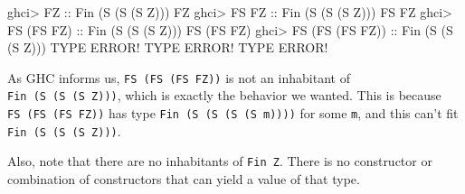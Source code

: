 \documentclass[]{article}
\newenvironment{Shaded}{}{}
\newcommand{\DataTypeTok}[1]{\textcolor[rgb]{0.56,0.13,0.00}{#1}}
\newcommand{\NormalTok}[1]{#1}
\newcommand{\OperatorTok}[1]{\textcolor[rgb]{0.40,0.40,0.40}{#1}}
\newcommand{\OtherTok}[1]{\textcolor[rgb]{0.00,0.44,0.13}{#1}}
\begin{document}
\begin{Shaded}
\begin{Highlighting}[]
\NormalTok{ghci}\OperatorTok{\textgreater{}} \DataTypeTok{FZ}\OtherTok{              ::} \DataTypeTok{Fin}\NormalTok{ (}\DataTypeTok{\textquotesingle{}S}\NormalTok{ (}\DataTypeTok{\textquotesingle{}S}\NormalTok{ (}\DataTypeTok{\textquotesingle{}S} \DataTypeTok{\textquotesingle{}Z}\NormalTok{)))}
\DataTypeTok{FZ}
\NormalTok{ghci}\OperatorTok{\textgreater{}} \DataTypeTok{FS} \DataTypeTok{FZ}\OtherTok{           ::} \DataTypeTok{Fin}\NormalTok{ (}\DataTypeTok{\textquotesingle{}S}\NormalTok{ (}\DataTypeTok{\textquotesingle{}S}\NormalTok{ (}\DataTypeTok{\textquotesingle{}S} \DataTypeTok{\textquotesingle{}Z}\NormalTok{)))}
\DataTypeTok{FS} \DataTypeTok{FZ}
\NormalTok{ghci}\OperatorTok{\textgreater{}} \DataTypeTok{FS}\NormalTok{ (}\DataTypeTok{FS} \DataTypeTok{FZ}\NormalTok{)}\OtherTok{      ::} \DataTypeTok{Fin}\NormalTok{ (}\DataTypeTok{\textquotesingle{}S}\NormalTok{ (}\DataTypeTok{\textquotesingle{}S}\NormalTok{ (}\DataTypeTok{\textquotesingle{}S} \DataTypeTok{\textquotesingle{}Z}\NormalTok{)))}
\DataTypeTok{FS}\NormalTok{ (}\DataTypeTok{FS} \DataTypeTok{FZ}\NormalTok{)}
\NormalTok{ghci}\OperatorTok{\textgreater{}} \DataTypeTok{FS}\NormalTok{ (}\DataTypeTok{FS}\NormalTok{ (}\DataTypeTok{FS} \DataTypeTok{FZ}\NormalTok{))}\OtherTok{ ::} \DataTypeTok{Fin}\NormalTok{ (}\DataTypeTok{\textquotesingle{}S}\NormalTok{ (}\DataTypeTok{\textquotesingle{}S}\NormalTok{ (}\DataTypeTok{\textquotesingle{}S} \DataTypeTok{\textquotesingle{}Z}\NormalTok{)))}
\DataTypeTok{TYPE} \DataTypeTok{ERROR}\OperatorTok{!}  \DataTypeTok{TYPE} \DataTypeTok{ERROR}\OperatorTok{!}  \DataTypeTok{TYPE} \DataTypeTok{ERROR}\OperatorTok{!}
\end{Highlighting}
\end{Shaded}

As GHC informs us, \texttt{FS\ (FS\ (FS\ FZ))} is not an inhabitant of
\texttt{Fin\ (\textquotesingle{}S\ (\textquotesingle{}S\ (\textquotesingle{}S\ \textquotesingle{}Z)))},
which is exactly the behavior we wanted. This is because
\texttt{FS\ (FS\ (FS\ FZ))} has type
\texttt{Fin\ (\textquotesingle{}S\ (\textquotesingle{}S\ (\textquotesingle{}S\ (\textquotesingle{}S\ m))))}
for some \texttt{m}, and this can't fit
\texttt{Fin\ (\textquotesingle{}S\ (\textquotesingle{}S\ (\textquotesingle{}S\ \textquotesingle{}Z)))}.

Also, note that there are no inhabitants of \texttt{Fin\ \textquotesingle{}Z}.
There is no constructor or combination of constructors that can yield a value of
that type.
\end{document}
